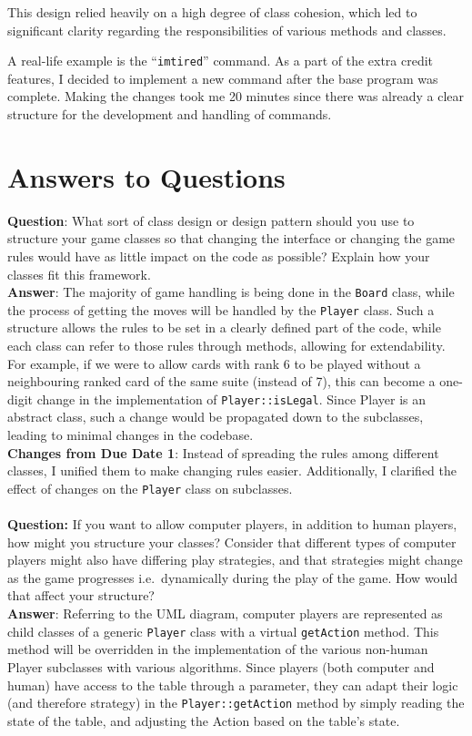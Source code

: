 \documentclass[12pt]{article}
\begin{document}
		This design relied heavily on a high degree of class cohesion, which led to significant clarity regarding the responsibilities of various methods and classes.

		A real-life example is the ``\texttt{imtired}'' command. As a part of the extra credit features, I decided to implement a new command after the base program was complete. Making the changes took me 20 minutes since there was already a clear structure for the development and handling of commands.
	\section{Answers to Questions}
		{\bf Question}: What sort of class design or design pattern should you use to structure your game classes so that changing the interface or changing the game rules would have as little impact on the code as possible? Explain how your classes fit this framework.\\
		{\bf Answer}: The majority of game handling is being done in the {\tt Board} class, while the process of getting the moves will be handled by the {\tt Player} class. Such a structure allows the rules to be set in a clearly defined part of the code, while each class can refer to those rules through methods, allowing for extendability. For example, if we were to allow cards with rank 6 to be played without a neighbouring ranked card of the same suite (instead of 7), this can become a one-digit change in the implementation of {\tt Player::isLegal}. Since Player is an abstract class, such a change would be propagated down to the subclasses, leading to minimal changes in the codebase.\\
		{\bf Changes from Due Date 1}: Instead of spreading the rules among different classes, I unified them to make changing rules easier. Additionally, I clarified the effect of changes on the \texttt{Player} class on subclasses.
		\\\\
		{\bf Question:} If you want to allow computer players, in addition to human players, how might you structure your classes? Consider that different types of computer players might also have differing play strategies, and that strategies might change as the game progresses i.e.\ dynamically during the play of the game. How would that affect your structure?\\
		{\bf Answer}: Referring to the UML diagram, computer players are represented as child classes of a generic {\tt Player} class with a virtual {\tt getAction} method. This method will be overridden in the implementation of the various non-human Player subclasses with various algorithms. Since players (both computer and human) have access to the table through a parameter, they can adapt their logic (and therefore strategy) in the {\tt Player::getAction} method by simply reading the state of the table, and adjusting the Action based on the table's state.\\
\end{document}
